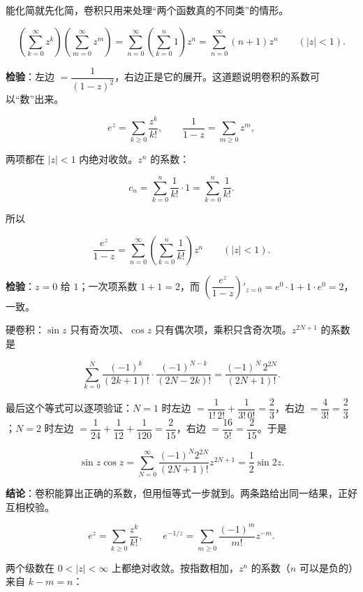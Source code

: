 \documentclass[11pt]{ctexart}
\let\origsubhdr\subhdr
\renewcommand{\subhdr}[1]{\par\needspace{4\baselineskip}\origsubhdr{#1}}
\let\orighdr\hdr
\renewcommand{\hdr}[2]{\par\needspace{9\baselineskip}\orighdr{#1}{#2}}
\begin{document}
能化简就先化简，卷积只用来处理“两个函数真的不同类”的情形。



\[ \left(\sum_{k=0}^{\infty}z^k\right)\left(\sum_{m=0}^{\infty}z^m\right)=\sum_{n=0}^{\infty}\left(\sum_{k=0}^{n}1\right)z^n=\sum_{n=0}^{\infty}(n+1)z^n\qquad(|z|<1) . \]

\textbf{检验}：左边 $=\dfrac{1}{(1-z)^2}$，右边正是它的展开。这道题说明卷积的系数可以“数”出来。


\[ e^z=\sum_{k\ge0}\frac{z^k}{k!},\qquad \frac{1}{1-z}=\sum_{m\ge0}z^m , \]

两项都在 $|z|<1$ 内绝对收敛。$z^n$ 的系数：

\[ c_n=\sum_{k=0}^{n}\frac{1}{k!}\cdot1=\sum_{k=0}^{n}\frac{1}{k!} . \]

所以

\[ \frac{e^z}{1-z}=\sum_{n=0}^{\infty}\left(\sum_{k=0}^{n}\frac{1}{k!}\right)z^n\qquad(|z|<1) . \]

\textbf{检验}：$z=0$ 给 $1$；一次项系数 $1+1=2$，而 $\left(\dfrac{e^z}{1-z}\right)'_{z=0}=e^0\cdot1+1\cdot e^0=2$，一致。


硬卷积：$\sin z$ 只有奇次项、$\cos z$ 只有偶次项，乘积只含奇次项。$z^{2N+1}$ 的系数是

\[ \sum_{k=0}^{N}\frac{(-1)^k}{(2k+1)!}\cdot\frac{(-1)^{N-k}}{(2N-2k)!}=\frac{(-1)^N\,2^{2N}}{(2N+1)!} . \]

最后这个等式可以逐项验证：$N=1$ 时左边 $=\dfrac{1}{1!\,2!}+\dfrac{1}{3!\,0!}=\dfrac23$，右边 $=\dfrac{4}{3!}=\dfrac23$；$N=2$ 时左边 $=\dfrac{1}{24}+\dfrac{1}{12}+\dfrac{1}{120}=\dfrac{2}{15}$，右边 $=\dfrac{16}{5!}=\dfrac{2}{15}$。于是

\[ \sin z\cos z=\sum_{N=0}^{\infty}\frac{(-1)^N2^{2N}}{(2N+1)!}z^{2N+1}=\frac12\sin 2z . \]

\textbf{结论}：卷积能算出正确的系数，但用恒等式一步就到。两条路给出同一结果，正好互相校验。


\[ e^{z}=\sum_{k\ge0}\frac{z^k}{k!},\qquad e^{-1/z}=\sum_{m\ge0}\frac{(-1)^m}{m!}z^{-m} . \]

两个级数在 $0<|z|<\infty$ 上都绝对收敛。按指数相加，$z^n$ 的系数（$n$ 可以是负的）来自 $k-m=n$：
\end{document}
